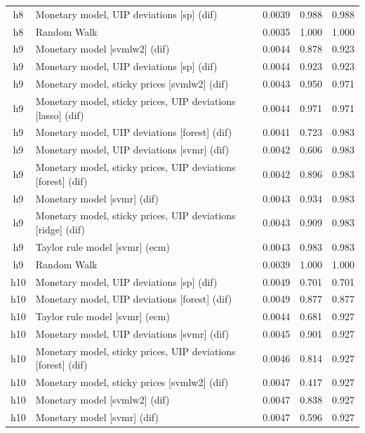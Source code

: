 \begin{ThreePartTable}
\begin{longtable}[t]{cp{5.5cm}ccc}
h8 & \raggedright Monetary model, UIP deviations [sp] (dif) & 0.0039 & 0.988 & 0.988\\
h8 & \raggedright Random Walk & 0.0035 & 1.000 & 1.000\\
\addlinespace
h9 & \raggedright Monetary model [svmlw2] (dif) & 0.0044 & 0.878 & 0.923\\
h9 & \raggedright Monetary model, UIP deviations [sp] (dif) & 0.0044 & 0.923 & 0.923\\
h9 & \raggedright Monetary model, sticky prices [svmlw2] (dif) & 0.0043 & 0.950 & 0.971\\
h9 & \raggedright Monetary model, sticky prices, UIP deviations [lasso] (dif) & 0.0044 & 0.971 & 0.971\\
h9 & \raggedright Monetary model, UIP deviations [forest] (dif) & 0.0041 & 0.723 & 0.983\\
h9 & \raggedright Monetary model, UIP deviations [svmr] (dif) & 0.0042 & 0.606 & 0.983\\
h9 & \raggedright Monetary model, sticky prices, UIP deviations [forest] (dif) & 0.0042 & 0.896 & 0.983\\
h9 & \raggedright Monetary model [svmr] (dif) & 0.0043 & 0.934 & 0.983\\
h9 & \raggedright Monetary model, sticky prices, UIP deviations [ridge] (dif) & 0.0043 & 0.909 & 0.983\\
h9 & \raggedright Taylor rule model [svmr] (ecm) & 0.0043 & 0.983 & 0.983\\
h9 & \raggedright Random Walk & 0.0039 & 1.000 & 1.000\\
\addlinespace
h10 & \raggedright Monetary model, UIP deviations [sp] (dif) & 0.0049 & 0.701 & 0.701\\
h10 & \raggedright Monetary model, UIP deviations [forest] (dif) & 0.0049 & 0.877 & 0.877\\
h10 & \raggedright Taylor rule model [svmr] (ecm) & 0.0044 & 0.681 & 0.927\\
h10 & \raggedright Monetary model, UIP deviations [svmr] (dif) & 0.0045 & 0.901 & 0.927\\
h10 & \raggedright Monetary model, sticky prices, UIP deviations [forest] (dif) & 0.0046 & 0.814 & 0.927\\
h10 & \raggedright Monetary model, sticky prices [svmlw2] (dif) & 0.0047 & 0.417 & 0.927\\
h10 & \raggedright Monetary model [svmlw2] (dif) & 0.0047 & 0.838 & 0.927\\
h10 & \raggedright Monetary model [svmr] (dif) & 0.0047 & 0.596 & 0.927\\

\end{longtable}
\end{ThreePartTable}
